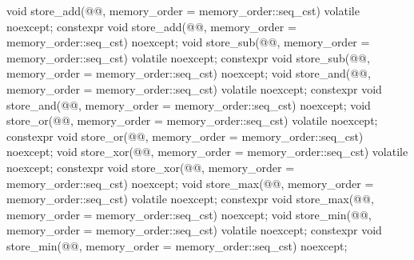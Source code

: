 \begin{codeblock}
{{    void store_add(@@,
                   memory_order = memory_order::seq_cst) volatile noexcept;
    constexpr void store_add(@@,
                             memory_order = memory_order::seq_cst) noexcept;
    void store_sub(@@,
                   memory_order = memory_order::seq_cst) volatile noexcept;
    constexpr void store_sub(@@,
                             memory_order = memory_order::seq_cst) noexcept;
    void store_and(@@,
                   memory_order = memory_order::seq_cst) volatile noexcept;
    constexpr void store_and(@@,
                             memory_order = memory_order::seq_cst) noexcept;
    void store_or(@@,
                  memory_order = memory_order::seq_cst) volatile noexcept;
    constexpr void store_or(@@,
                            memory_order = memory_order::seq_cst) noexcept;
    void store_xor(@@,
                   memory_order = memory_order::seq_cst) volatile noexcept;
    constexpr void store_xor(@@,
                             memory_order = memory_order::seq_cst) noexcept;
    void store_max(@@,
                   memory_order = memory_order::seq_cst) volatile noexcept;
    constexpr void store_max(@@,
                             memory_order = memory_order::seq_cst) noexcept;
    void store_min(@@,
                   memory_order = memory_order::seq_cst) volatile noexcept;
    constexpr void store_min(@@,
                             memory_order = memory_order::seq_cst) noexcept;

}}
\end{codeblock}
